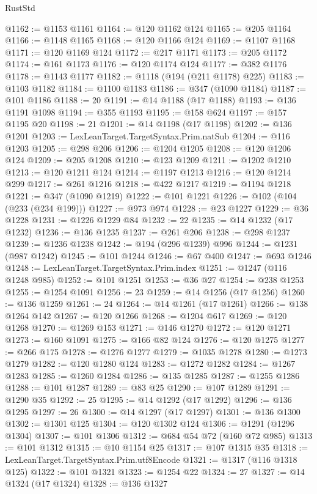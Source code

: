 \begin{lexlean}{RustStd}
\begin{coremodule}
@1162 := @1153 @1161
@1164 := @120 @1162 @124
@1165 := @205 @1164
@1166 := @1148 @1165
@1168 := @120 @1166 @124
@1169 := @1107 @1168
@1171 := @120 @1169 @124
@1172 := @217 @1171
@1173 := @205 @1172
@1174 := @161 @1173
@1176 := @120 @1174 @124
@1177 := @382 @1176
@1178 := @1143 @1177
@1182 := @1118 (@194 (@211 @1178) @225)
@1183 := @1103 @1182
@1184 := @1100 @1183
@1186 := @347 (@1090 @1184)
@1187 := @101 @1186
@1188 := 20
@1191 := @14 @1188 (@17 @1188)
@1193 := @136 @1191 @1098
@1194 := @355 @1193
@1195 := @158 @624
@1197 := @157 @1195 @20
@1198 := 21
@1201 := @14 @1198 (@17 @1198)
@1202 := @136 @1201
@1203 := LexLeanTarget.TargetSyntax.Prim.natSub
@1204 := @116 @1203
@1205 := @298 @206
@1206 := @1204 @1205
@1208 := @120 @1206 @124
@1209 := @205 @1208
@1210 := @123 @1209
@1211 := @1202 @1210
@1213 := @120 @1211 @124
@1214 := @1197 @1213
@1216 := @120 @1214 @299
@1217 := @261 @1216
@1218 := @422 @1217
@1219 := @1194 @1218
@1221 := @347 (@1090 @1219)
@1222 := @101 @1221
@1226 := @102 (@104 (@233 (@234 @199)))
@1227 := @973 @974
@1228 := @23 @1227
@1229 := @36 @1228
@1231 := @1226 @1229 @84
@1232 := 22
@1235 := @14 @1232 (@17 @1232)
@1236 := @136 @1235
@1237 := @261 @206
@1238 := @298 @1237
@1239 := @1236 @1238
@1242 := @194 (@296 @1239) @996
@1244 := @1231 (@987 @1242)
@1245 := @101 @1244
@1246 := @67 @400
@1247 := @693 @1246
@1248 := LexLeanTarget.TargetSyntax.Prim.index
@1251 := @1247 (@116 @1248 @985)
@1252 := @101 @1251
@1253 := @36 @27
@1254 := @238 @1253
@1255 := @1254 @1091
@1256 := 23
@1259 := @14 @1256 (@17 @1256)
@1260 := @136 @1259
@1261 := 24
@1264 := @14 @1261 (@17 @1261)
@1266 := @138 @1264 @142
@1267 := @120 @1266
@1268 := @1204 @617
@1269 := @120 @1268
@1270 := @1269 @153
@1271 := @146 @1270
@1272 := @120 @1271
@1273 := @160 @1091
@1275 := @166 @82 @124
@1276 := @120 @1275
@1277 := @266 @175
@1278 := @1276 @1277
@1279 := @1035 @1278
@1280 := @1273 @1279
@1282 := @120 @1280 @124
@1283 := @1272 @1282
@1284 := @1267 @1283
@1285 := @1260 @1284
@1286 := @135 @1285
@1287 := @1255 @1286
@1288 := @101 @1287
@1289 := @83 @25
@1290 := @107 @1289
@1291 := @1290 @35
@1292 := 25
@1295 := @14 @1292 (@17 @1292)
@1296 := @136 @1295
@1297 := 26
@1300 := @14 @1297 (@17 @1297)
@1301 := @136 @1300
@1302 := @1301 @125
@1304 := @120 @1302 @124
@1306 := @1291 (@1296 @1304)
@1307 := @101 @1306
@1312 := @684 @54 @72 (@160 @72 @985)
@1313 := @101 @1312
@1315 := @10 @1154 @25
@1317 := @107 @1315 @35
@1318 := LexLeanTarget.TargetSyntax.Prim.utf8Encode
@1321 := @1317 (@116 @1318 @125)
@1322 := @101 @1321
@1323 := @1254 @22
@1324 := 27
@1327 := @14 @1324 (@17 @1324)
@1328 := @136 @1327

\end{coremodule}
\end{lexlean}
